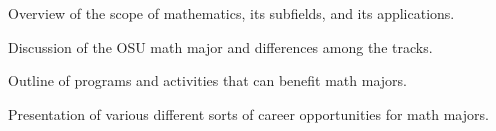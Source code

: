 \documentclass{osucourse}
\begin{document}
\CatalogDescription
\PrerequisitesAndExclusions

\begin{TopicsList}
\item Overview of the scope of mathematics, its subfields, and its applications.
\item Discussion of the OSU math major and differences among the tracks.
\item Outline of programs and activities that can benefit math majors.
\item Presentation of various different sorts of career opportunities for math majors.
\end{TopicsList}
\end{document}
